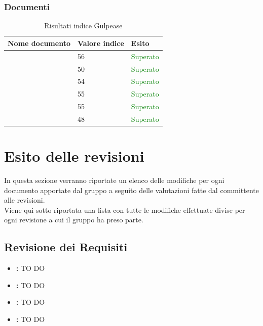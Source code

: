  	\subsubsection{Documenti}
		\begin{table}[!ht]
			\begin{center}
				\begin{tabularx}{0.9\textwidth}{|l|l|X|}
					\hline
					\textbf{Nome documento} & \textbf{Valore indice} & \textbf{Esito}\\
					\hline						
					\docNameVersionAdR & 56 & \textcolor{green}{Superato}\\
					\hline
					\docNameVersionGlo & 50 & \textcolor{green}{Superato}\\
					\hline					
					\docNameVersionNdP & 54 & \textcolor{green}{Superato}\\
					\hline					
					\docNameVersionPdP & 55 & \textcolor{green}{Superato}\\
					\hline					
					\docNameVersionPdQ & 55 & \textcolor{green}{Superato}\\
					\hline					
					\docNameVersionSdF & 48 & \textcolor{green}{Superato}\\
					\hline				
				\end{tabularx}
			\end{center}
			\caption{Risultati indice Gulpease}
		\end{table}
			
\pagebreak

\section{Esito delle revisioni}
In questa sezione verranno riportate un elenco delle modifiche per ogni documento apportate dal gruppo a seguito delle valutazioni fatte dal committente alle revisioni.\\
Viene qui sotto riportata una lista con tutte le modifiche effettuate divise per ogni revisione a cui il gruppo ha preso parte.

	\subsection{Revisione dei Requisiti}
	\begin{itemize}
		\item \textbf{\docNameAdR:} TO DO
		\item \textbf{\docNameNdP:} TO DO
		\item \textbf{\docNamePdP:} TO DO
		\item \textbf{\docNamePdQ:} TO DO
	\end{itemize}

\pagebreak